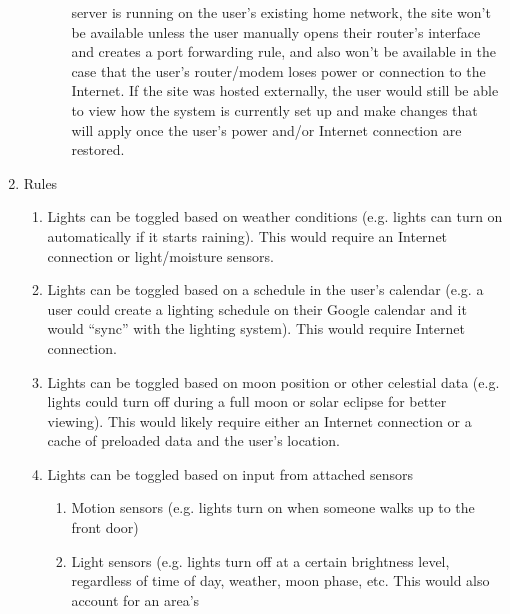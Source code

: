 \begin{enumerate}[resume]
\begin{enumerate}
\begin{enumerate}
                        server is running on the user's existing home network,
                        the site won't be available unless the user manually
                        opens their router's interface and creates a port
                        forwarding rule, and also won't be available in the
                        case that the user's router/modem loses power or
                        connection to the Internet.  If the site was hosted
                        externally, the user would still be able to view how
                        the system is currently set up and make changes that
                        will apply once the user's power and/or Internet
                        connection are restored.
                \end{enumerate}
        \end{enumerate}
    \item Rules
        \begin{enumerate}
            \item Lights can be toggled based on weather conditions (e.g.
                lights can turn on automatically if it starts raining).  This
                would require an Internet connection or light/moisture sensors.
            \item Lights can be toggled based on a schedule in the user's
                calendar (e.g. a user could create a lighting schedule on their
                Google calendar and it would ``sync'' with the lighting
                system).  This would require Internet connection.
            \item Lights can be toggled based on moon position or other
                celestial data (e.g. lights could turn off during a full moon
                or solar eclipse for better viewing).  This would likely
                require either an Internet connection or a cache of preloaded
                data and the user's location.
            \item Lights can be toggled based on input from attached sensors
                \begin{enumerate}
                    \item Motion sensors (e.g. lights turn on when someone
                        walks up to the front door)
                    \item Light sensors (e.g. lights turn off at a certain
                        brightness level, regardless of time of day, weather,
                        moon phase, etc.  This would also account for an area's

\end{enumerate}
\end{enumerate}
\end{enumerate}
